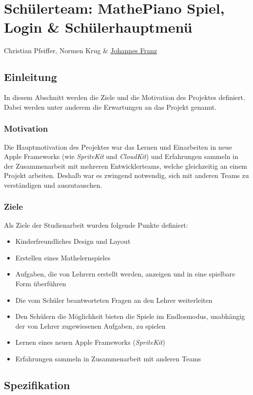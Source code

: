 \chapter{Schülerteam: MathePiano Spiel, Login \& Schülerhauptmenü}
Christian Pfeiffer, Normen Krug \& \href{mailto:jofranz90@gmail.com?subject=Swift-Studienarbeit}{Johannes Franz}


\section{Einleitung}
In diesem Abschnitt werden die Ziele und die Motivation des Projektes definiert. Dabei werden unter anderem die Erwartungen an das Projekt genannt.
\subsection{Motivation}
Die Hauptmotivation des Projektes war das Lernen und Einarbeiten in neue Apple Frameworks (wie \textit{SpriteKit} und \textit{CloudKit}) und Erfahrungen sammeln in der Zusammenarbeit mit mehreren Entwicklerteams, welche gleichzeitig an einem Projekt arbeiten. Deshalb war es zwingend notwendig, sich mit anderen Teams zu verständigen und auszutauschen.  

\subsection{Ziele}
Als Ziele der Studienarbeit wurden folgende Punkte definiert: 
\begin{itemize}
\item Kinderfreundliches Design und Layout
\item Erstellen eines Mathelernspieles 
\item Aufgaben, die von Lehrern erstellt werden, anzeigen und in eine spielbare Form überführen
\item Die vom Schüler beantworteten Fragen an den Lehrer weiterleiten
\item Den Schülern die Möglichkeit bieten die Spiele im Endlosmodus, unabhängig der von Lehrer zugewiesenen Aufgaben, zu spielen
\item Lernen eines neuen Apple Frameworks (\textit{SpriteKit})
\item Erfahrungen sammeln in Zusammenarbeit mit anderen Teams
\end{itemize}
\section{Spezifikation}


